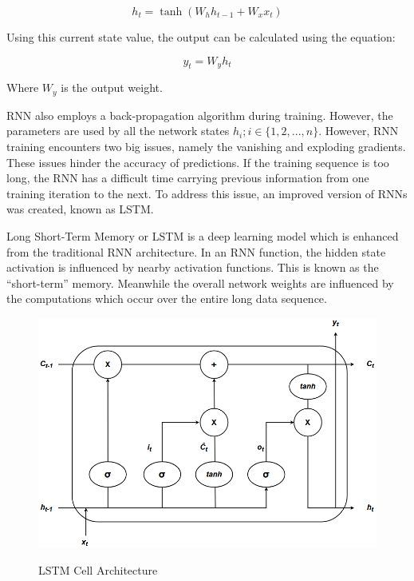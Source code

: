 \begin{equation}
    h_{t} = \tanh(W_{h}h_{t-1} + W_{x}x_{t})
\end{equation}

Using this current state value, the output can be calculated using the equation:

\begin{equation}
    y_{t} = W_{y}h_{t}
\end{equation}

Where $W_{y}$ is the output weight.\par

RNN also employs a back-propagation algorithm during training. However, the parameters are used by all the network states $h_{i}; i \in \{1, 2, ... , n\}$. However, RNN training encounters two big issues, namely the vanishing and exploding gradients. These issues hinder the accuracy of predictions. If the training sequence is too long, the RNN has a difficult time carrying previous information from one training iteration to the next. To address this issue, an improved version of RNNs was created, known as LSTM.\par

Long Short-Term Memory or LSTM is a deep learning model which is enhanced from the traditional RNN architecture. In an RNN function, the hidden state activation is influenced by nearby activation functions. This is known as the ``short-term'' memory. Meanwhile the overall network weights are influenced by the computations which occur over the entire long data sequence.\par

\begin{figure}[htb]
    \centering
    \caption{LSTM Cell Architecture}
    \includegraphics[width=0.8\linewidth]{Figures/LSTM-Cell-Architecture.png}
    \label{fig:lstm-cell-architecture}
\end{figure}

